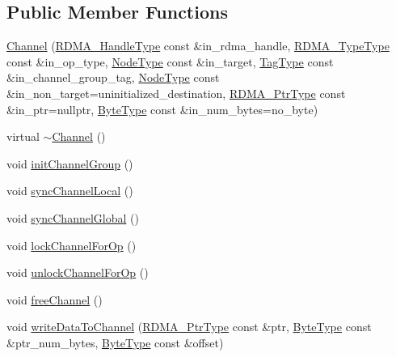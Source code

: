 \subsection*{Public Member Functions}
\begin{DoxyCompactItemize}
\item 
\hyperlink{structvt_1_1rdma_1_1_channel_ae15a5cd0e393f64192675d5a33796523}{Channel} (\hyperlink{namespacevt_a10442579ec4e7ebef223818e64bcf908}{R\+D\+M\+A\+\_\+\+Handle\+Type} const \&in\+\_\+rdma\+\_\+handle, \hyperlink{namespacevt_1_1rdma_ac848e1d9da43db6294bd06f83e5d3946}{R\+D\+M\+A\+\_\+\+Type\+Type} const \&in\+\_\+op\+\_\+type, \hyperlink{namespacevt_a866da9d0efc19c0a1ce79e9e492f47e2}{Node\+Type} const \&in\+\_\+target, \hyperlink{namespacevt_a84ab281dae04a52a4b243d6bf62d0e52}{Tag\+Type} const \&in\+\_\+channel\+\_\+group\+\_\+tag, \hyperlink{namespacevt_a866da9d0efc19c0a1ce79e9e492f47e2}{Node\+Type} const \&in\+\_\+non\+\_\+target=uninitialized\+\_\+destination, \hyperlink{namespacevt_a9e2c953286c7616f7c218e9951790776}{R\+D\+M\+A\+\_\+\+Ptr\+Type} const \&in\+\_\+ptr=nullptr, \hyperlink{namespacevt_aab8d55968084610ce3b17057981e9300}{Byte\+Type} const \&in\+\_\+num\+\_\+bytes=no\+\_\+byte)
\item 
virtual \hyperlink{structvt_1_1rdma_1_1_channel_a4e32f293df8c7d988a080065647c4253}{$\sim$\+Channel} ()
\item 
void \hyperlink{structvt_1_1rdma_1_1_channel_a8b95715326b4f434ebe53c5577403b3b}{init\+Channel\+Group} ()
\item 
void \hyperlink{structvt_1_1rdma_1_1_channel_a5ce567dd26c64a6d8a8ea9a9b3d525f8}{sync\+Channel\+Local} ()
\item 
void \hyperlink{structvt_1_1rdma_1_1_channel_a858e3b9d213cd2fb98e021c5c8b58e96}{sync\+Channel\+Global} ()
\item 
void \hyperlink{structvt_1_1rdma_1_1_channel_ac9dca439a032110524cf303925bace58}{lock\+Channel\+For\+Op} ()
\item 
void \hyperlink{structvt_1_1rdma_1_1_channel_adb5c10cdeb4e72e54433622091b543c6}{unlock\+Channel\+For\+Op} ()
\item 
void \hyperlink{structvt_1_1rdma_1_1_channel_a0e68ef1830979531a430f2a9b0206afb}{free\+Channel} ()
\item 
void \hyperlink{structvt_1_1rdma_1_1_channel_af7d6fb54933f6ad3d12cb600ababfa18}{write\+Data\+To\+Channel} (\hyperlink{namespacevt_a9e2c953286c7616f7c218e9951790776}{R\+D\+M\+A\+\_\+\+Ptr\+Type} const \&ptr, \hyperlink{namespacevt_aab8d55968084610ce3b17057981e9300}{Byte\+Type} const \&ptr\+\_\+num\+\_\+bytes, \hyperlink{namespacevt_aab8d55968084610ce3b17057981e9300}{Byte\+Type} const \&offset)

\end{DoxyCompactItemize}

